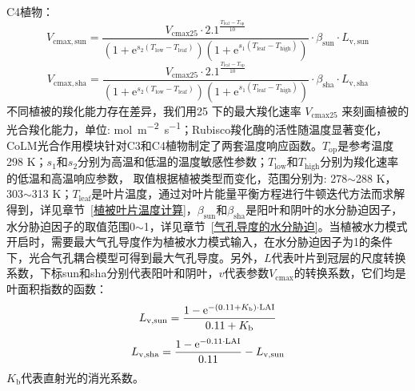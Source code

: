 C4植物：
\begin{equation}\label{V_cmaxsun_b}
V_{\mathrm{cmax,sun }}= \frac{V_{\mathrm{cmax 25}} \cdot 2.1^{\frac{T_{\mathrm{{leaf }}}-T_{\mathrm{o p}}}{10}}}{\left(1+{\mathrm e}^{s_{\mathrm{2}}\left(T_{\mathrm{{low }}}
 - T_{\mathrm{{leaf }}}\right)}\right)\left(1+{\mathrm e}^{s_{\mathrm{1}}\left(T_{\mathrm{{leaf }}}-T_{\mathrm{h i g h}}\right)}\right)} \cdot \beta_{\mathrm{sun}} \cdot L_{\mathrm{v,sun}}
\end{equation}
\begin{equation}\label{V_cmaxsha_b}
V_{\mathrm{cmax,sha }}= \frac{V_{\mathrm{cmax 25}} \cdot 2.1^{\frac{T_{\mathrm{{leaf }}}-T_{\mathrm{o p}}}{10}}}{\left(1+{\mathrm e}^{s_{\mathrm{2}}\left(T_{\mathrm{{low }}}
 - T_{\mathrm{{leaf }}}\right)}\right)\left(1+{\mathrm e}^{s_{\mathrm{1}}\left(T_{\mathrm{{leaf }}}-T_{\mathrm{h i g h}}\right)}\right)} \cdot \beta_{\mathrm{sha}} \cdot L_{\mathrm{v,sha}}
\end{equation}
不同植被的羧化能力存在差异，我们用25 \textcelsius 下的最大羧化速率 $V_{\mathrm{cmax 25}}$ 来刻画植被的光合羧化能力，单位: \unit{mol.m^{-2}.s^{-1}}；Rubisco羧化酶的活性随温度显著变化，CoLM光合作用模块针对C3和C4植物制定了两套温度响应函数。$T_{\mathrm{op}}$是参考温度298 K；$s_1$和$s_2$分别为高温和低温的温度敏感性参数；$T_{\mathrm{low}}$和$T_{\mathrm{high}}$分别为羧化速率的低温和高温响应参数，
取值根据植被类型而变化，范围分别为: 278$\sim$288 K，303$\sim$313 K；$T_{\mathrm{leaf}}$是叶片温度，通过对叶片能量平衡方程进行牛顿迭代方法而求解得到，详见章节~\ref{植被叶片温度计算}，$\beta_{\mathrm{sun}}$和$\beta_{\mathrm{sha}}$是阳叶和阴叶的水分胁迫因子，水分胁迫因子的取值范围0$\sim$1，详见章节~\ref{气孔导度的水分胁迫}。当植被水力模式开启时，需要最大气孔导度作为植被水力模式输入，在水分胁迫因子为1的条件下，光合气孔耦合模型可得到最大气孔导度。另外，$L$代表叶片到冠层的尺度转换系数，下标sun和sha分别代表阳叶和阴叶，$v$代表参数$V_{\mathrm{cmax}}$的转换系数，它们均是叶面积指数的函数：
%
\begin{equation}\label{L_vsun}
L_{\mathrm{v,sun}}=\frac{1-{\mathrm e}^{-\left(0.11+K_{\mathrm{b}}\right) \cdot {\rm LAI}}}{0.11+K_{\mathrm{b}}}
\end{equation}
\begin{equation}\label{L_vsha}
L_{\mathrm{v,sha}}=\frac{1-{\mathrm e}^{-0.11\cdot {\rm LAI}}}{0.11} - L_{\mathrm{v,sun}}
\end{equation}
$K_{\mathrm{b}}$代表直射光的消光系数。

